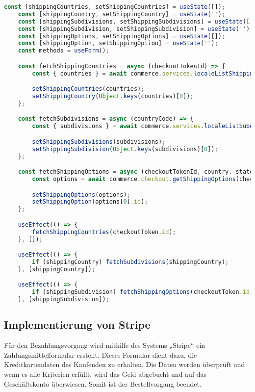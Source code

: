\begin{lstlisting}[language=JavaScript, caption=Adressformular]
    const [shippingCountries, setShippingCountries] = useState([]);
    const [shippingCountry, setShippingCountry] = useState('');
    const [shippingSubdivisions, setShippingSubdivisions] = useState([]);
    const [shippingSubdivision, setShippingSubdivision] = useState('');
    const [shippingOptions, setShippingOptions] = useState([]);
    const [shippingOption, setShippingOption] = useState('');
    const methods = useForm();

    const fetchShippingCountries = async (checkoutTokenId) => {
        const { countries } = await commerce.services.localeListShippingCountries(checkoutTokenId);

        setShippingCountries(countries);
        setShippingCountry(Object.keys(countries)[0]);
    };

    const fetchSubdivisions = async (countryCode) => {
        const { subdivisions } = await commerce.services.localeListSubdivisions(countryCode);

        setShippingSubdivisions(subdivisions);
        setShippingSubdivision(Object.keys(subdivisions)[0]);
    };

    const fetchShippingOptions = async (checkoutTokenId, country, stateProvince = null) => {
        const options = await commerce.checkout.getShippingOptions(checkoutTokenId, { country, region: stateProvince });

        setShippingOptions(options);
        setShippingOption(options[0].id);
    };

    useEffect(() => {
        fetchShippingCountries(checkoutToken.id);
    }, []);

    useEffect(() => {
        if (shippingCountry) fetchSubdivisions(shippingCountry);
    }, [shippingCountry]);

    useEffect(() => {
        if (shippingSubdivision) fetchShippingOptions(checkoutToken.id, shippingCountry, shippingSubdivision);
    }, [shippingSubdivision]);
\end{lstlisting}

\newpage

\subsection{Implementierung von Stripe}

Für den Bezahlungsvorgang wird mithilfe des Systems „Stripe“ ein Zahlungsmittelformular erstellt. Dieses Formular dient dazu, die Kreditkartendaten des Kaufenden zu erhalten. Die Daten werden überprüft und wenn es alle Kriterien erfüllt, wird das Geld abgebucht und auf das Geschäftskonto überwiesen. Somit ist der Bestellvorgang beendet.


